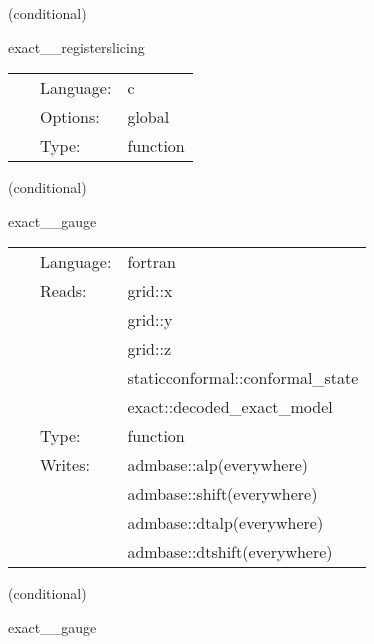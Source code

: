 \vspace{5mm}

   (conditional) 

\hspace{5mm} exact\_\_registerslicing 

\hspace{5mm}{\it register slicings } 


\hspace{5mm}

 \begin{tabular*}{160mm}{cll} 
~ & Language:  & c \\ 
~ & Options:  & global \\ 
~ & Type:  & function \\ 
\end{tabular*} 


\vspace{5mm}

   (conditional) 

\hspace{5mm} exact\_\_gauge 

\hspace{5mm}{\it set evolution lapse and/or shift from exact solution on a trivial slice } 


\hspace{5mm}

 \begin{tabular*}{160mm}{cll} 
~ & Language:  & fortran \\ 
~ & Reads:  & grid::x \\ 
~& ~ &grid::y\\ 
~& ~ &grid::z\\ 
~& ~ &staticconformal::conformal\_state\\ 
~& ~ &exact::decoded\_exact\_model\\ 
~ & Type:  & function \\ 
~ & Writes:  & admbase::alp(everywhere) \\ 
~& ~ &admbase::shift(everywhere)\\ 
~& ~ &admbase::dtalp(everywhere)\\ 
~& ~ &admbase::dtshift(everywhere)\\ 
\end{tabular*} 


\vspace{5mm}

   (conditional) 

\hspace{5mm} exact\_\_gauge 

